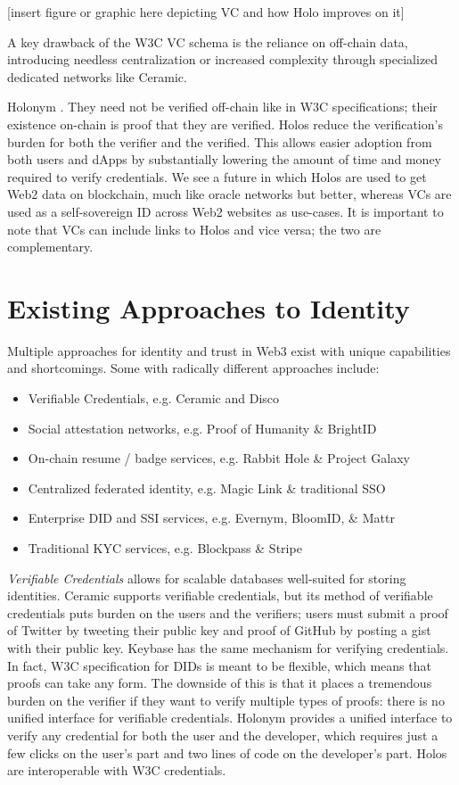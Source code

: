 \documentclass[11pt,oneside,a4paper]{article}
\begin{document}
[insert figure or graphic here depicting VC and how Holo improves on it]

A key drawback of the W3C VC schema is the reliance on off-chain data, introducing needless centralization or increased complexity through specialized dedicated networks like Ceramic.  

Holonym . They need not be verified off-chain like in W3C specifications; their existence on-chain is proof that they are verified. Holos reduce the verification's burden for both the verifier and the verified. This allows easier adoption from both users and dApps by substantially lowering the amount of time and money required to verify credentials.  We see a future in which Holos are used to get Web2 data on blockchain, much like oracle networks but better, whereas VCs are used as a self-sovereign ID across Web2 websites as use-cases. It is important to note that VCs can include links to Holos and vice versa; the two are complementary.

\section*{Existing Approaches to Identity}
Multiple approaches for identity and trust in Web3 exist with unique capabilities and shortcomings. Some with radically different approaches include:
	\begin{itemize}
		\item Verifiable Credentials, e.g. Ceramic and Disco
		\item Social attestation networks, e.g. Proof of Humanity \& BrightID
		\item On-chain resume / badge services, e.g. Rabbit Hole \& Project Galaxy
		\item Centralized federated identity, e.g. Magic Link \& traditional SSO
		\item Enterprise DID and SSI services, e.g. Evernym, BloomID, \& Mattr 
		\item Traditional KYC services, e.g. Blockpass \& Stripe
		
	\end{itemize}
	
	\textit{Verifiable Credentials } allows for scalable databases well-suited for storing identities. Ceramic supports verifiable credentials, but its method of verifiable credentials puts burden on the users and the verifiers; users must submit a proof of Twitter by tweeting their public key and proof of GitHub by posting a gist with their public key. Keybase has the same mechanism for verifying credentials. In fact, W3C specification for DIDs is meant to be flexible, which means that proofs can take any form. The downside of this is that it places a tremendous burden on the verifier if they want to verify multiple types of proofs: there is no unified interface for verifiable credentials. 
	Holonym provides a unified interface to verify any credential for both the user and the developer, which requires just a few clicks on the user's part and two lines of code on the developer's part. Holos are interoperable with W3C credentials.
	
\end{document}
